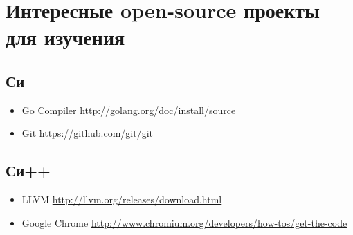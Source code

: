 ﻿\section{Интересные open-source проекты для изучения}

\subsection{Си}

\begin{itemize}
\item
Go Compiler \url{http://golang.org/doc/install/source}

\item
Git \url{https://github.com/git/git}
\end{itemize}

\subsection{Си++}

\begin{itemize}
\item
LLVM \url{http://llvm.org/releases/download.html}

\item
Google Chrome \url{http://www.chromium.org/developers/how-tos/get-the-code}
\end{itemize}

